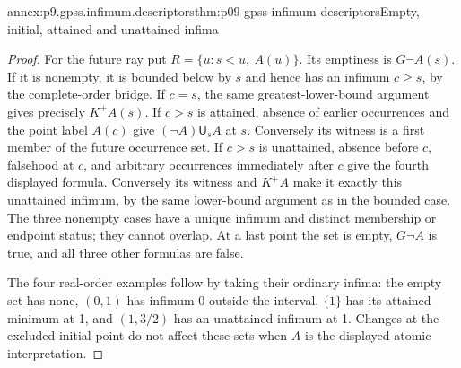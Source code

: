 \begin{annexitem}{annex:p9.gpss.infimum.descriptors}{thm:p09-gpss-infimum-descriptors}{Empty, initial, attained and unattained infima}
\begin{proof}
For the future ray put \(R=\{u:s<u,\ A(u)\}\).
Its emptiness is \(G\neg A(s)\). If it is nonempty,
it is bounded below by \(s\) and hence has an infimum
\(c\geq s\), by the complete-order bridge. If \(c=s\),
the same greatest-lower-bound argument gives precisely
\(K^+A(s)\). If \(c>s\) is attained, absence of
earlier occurrences and the point label \(A(c)\)
give \((\neg A)\mathbin{\mathsf U_s}A\) at \(s\).
Conversely its witness is a first member of the
future occurrence set. If \(c>s\) is unattained,
absence before \(c\), falsehood at \(c\), and
arbitrary occurrences immediately after \(c\)
give the fourth displayed formula. Conversely
its witness and \(K^+A\) make it exactly this
unattained infimum, by the same lower-bound
argument as in the bounded case. The three
nonempty cases have a unique infimum and distinct
membership or endpoint status; they cannot
overlap. At a last point the set is empty,
\(G\neg A\) is true, and all three other
formulas are false.

The four real-order examples follow by taking their ordinary
infima: the empty set has none, \((0,1)\) has infimum
0 outside the interval, \(\{1\}\) has its attained
minimum at 1, and \((1,3/2)\) has an unattained infimum
at 1. Changes at the excluded initial point do not affect
these sets when \(A\) is the displayed atomic interpretation.
\end{proof}
\end{annexitem}

